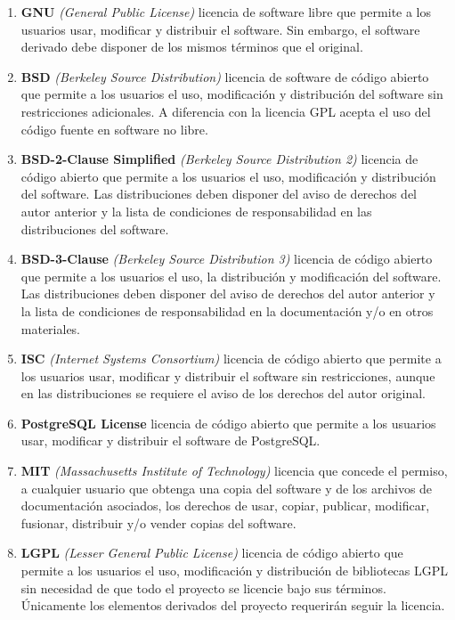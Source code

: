 \begin{enumerate}
    \item\textbf{GNU} \textit{(General Public License)} \cite{gnu} licencia de software libre que permite a los usuarios usar, modificar y distribuir el software. Sin embargo, el software derivado debe disponer de los mismos términos que el original.
    
    \item \textbf{BSD} \textit{(Berkeley Source Distribution)} \cite{bsd} licencia de software de código abierto que permite a los usuarios el uso, modificación y distribución del software sin restricciones adicionales. A diferencia con la licencia GPL acepta el uso del código fuente en software no libre.
    
    
    \item \textbf{BSD-2-Clause Simplified} \textit{(Berkeley Source Distribution 2)} \cite{bsd-2} licencia de código abierto que permite a los usuarios el uso, modificación y distribución del software. Las distribuciones deben disponer del aviso de derechos del autor anterior y la lista de condiciones de responsabilidad en las distribuciones del software.
    
    \item \textbf{BSD-3-Clause} \textit{(Berkeley Source Distribution 3)} \cite{bsd-3}
licencia de código abierto que permite a los usuarios el uso, la distribución y modificación del software. Las distribuciones deben disponer del aviso de derechos del autor anterior y la lista de condiciones de responsabilidad en la documentación y/o en otros materiales.

    \item \textbf{ISC} \textit{(Internet Systems Consortium)} \cite{isc} licencia de código abierto que permite a los usuarios usar, modificar y distribuir el software sin restricciones, aunque en las distribuciones se requiere el aviso de los derechos del autor original.
     
    \item \textbf{PostgreSQL License} \cite{postgresql-license} licencia de código abierto que permite a los usuarios usar, modificar y distribuir el software de PostgreSQL.
    
    \item \textbf{MIT} \textit{(Massachusetts Institute of Technology)}  \cite{mit} licencia que concede el permiso, a cualquier usuario que obtenga una copia del software y de los archivos de documentación asociados, los derechos de usar, copiar, publicar, modificar, fusionar, distribuir y/o vender copias del software.
    
    \item \textbf{LGPL} \textit{(Lesser General Public License)} \cite{lgpl} licencia de código abierto que permite a los usuarios el uso, modificación y distribución de bibliotecas LGPL sin necesidad de que todo el proyecto se licencie bajo sus términos. Únicamente los elementos derivados del proyecto requerirán seguir la licencia.
\end{enumerate}
